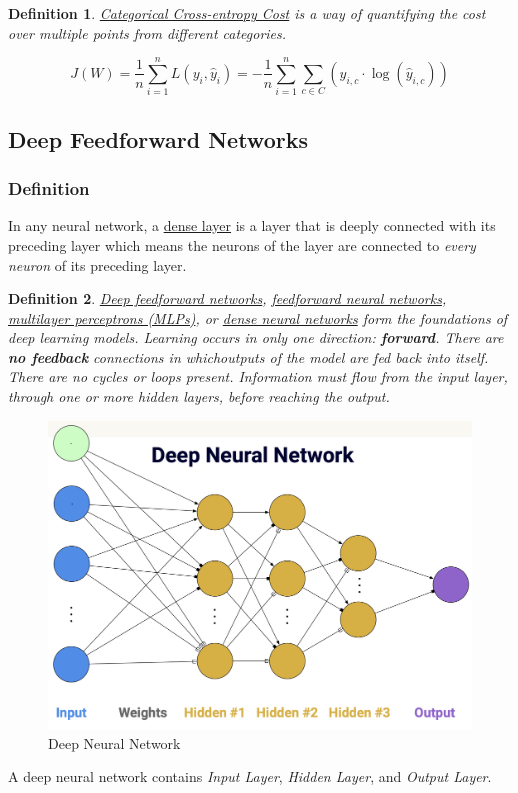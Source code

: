 \documentclass[11pt,a4paper]{article}
\newtheorem{definition}{Definition}
\begin{document}
\begin{definition}
    \underline{Categorical Cross-entropy Cost} is a way of quantifying the cost over multiple points from different categories.
\end{definition}
$$J(W)=\frac{1}{n}\sum_{i=1}^n L(y_i,\hat{y}_i)=-\frac{1}{n}\sum_{i=1}^n\sum_{c\in C}\left(y_{i,c}\cdot \log(\hat{y}_{i,c})\right)$$














\subsection{Deep Feedforward Networks}

\subsubsection{Definition}
In any neural network, a \underline{dense layer} is a layer that is deeply connected with its preceding layer which means the neurons of the layer are connected to \textit{every neuron} of its preceding layer.

\begin{definition}
    \underline{Deep feedforward networks}, \underline{feedforward neural networks}, \underline{multilayer perceptrons (MLPs)}, or \underline{dense neural networks} form the foundations of deep learning models. Learning occurs in only one direction: \textbf{forward}. There are \textbf{no feedback} connections in whichoutputs of the model are fed back into itself. There are no cycles or loops present. Information must flow from the input layer, through one or more hidden layers, before reaching the output.
\end{definition}

\begin{center}\begin{figure}[htbp]
    \centering
    \includegraphics[scale=0.13]{deep.png}
    \caption{Deep Neural Network}
    \label{}
\end{figure}\end{center}
A deep neural network contains \textit{Input Layer}, \textit{Hidden Layer}, and \textit{Output Layer}.
\end{document}
